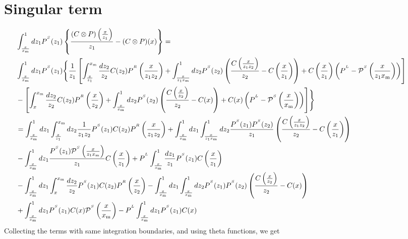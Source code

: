 \documentclass[a4paper]{article}
\newcommand{\PR}[0]{P^{^R}}
\newcommand{\PS}[0]{P^{^S}}
\newcommand{\PmS}[0]{\mathcal{P}^{^S}}
\newcommand{\PL}[0]{P^{^L}}
\newcommand{\xm}[0]{x_{\rm m}}
\newcommand{\zo}[0]{{z_1}}
\newcommand{\zt}[0]{{z_2}}
\begin{document}
\section{Singular term}

\begin{equation*}
	\hspace{-1.cm}\begin{split}
		&  \int_{\frac{x}{\xm}}^1dz_1 \PS(z_1) \left\{ \frac{(C \otimes P)\left(\frac{x}{z_1}\right)}{z_1} - (C \otimes P)(x)\right\} = \\
		& \int_{\frac{x}{\xm}}^1d\zo \PS(\zo) \Biggl\{\frac{1}{\zo}\left[\int_{\frac{x}{\zo}}^{\xm}\frac{d\zt}{\zt}C(\zt)\PR\left(\frac{x}{\zo \zt}\right) + \int_{\frac{x}{\zo \xm}}^1d\zt \PS(\zt)\left(\frac{C\left(\frac{x}{\zo \zt}\right)}{\zt}-C\left(\frac{x}{\zo}\right)\right) + C\left(\frac{x}{\zo}\right)\left(\PL - \PmS\left(\frac{x}{\zo \xm}\right)\right) \right] \\
		&- \left[\int_x^{\xm}\frac{d\zt}{\zt} C(\zt) \PR\left(\frac{x}{\zt}\right) + \int_\frac{x}{\xm}^1 d\zt \PS(\zt)\left(\frac{C\left(\frac{x}{\zt}\right)}{\zt}-C(x)\right) + C(x)\left(\PL - \PmS\left(\frac{x}{\xm}\right)\right) \right] \Biggr\} \\
		&=\int_{\frac{x}{\xm}}^1d\zo \int_\frac{x}{\zo}^{\xm}d\zt \frac{1}{\zo \zt} \PS(\zo) C(\zt) \PR\left(\frac{x}{\zo \zt}\right) + \int_{\frac{x}{\xm}}^1d\zo \int_\frac{x}{\zo \xm}^1d\zt \frac{\PS(\zo)\PS(\zt)}{\zo}\left(\frac{C\left(\frac{x}{\zo \zt}\right)}{\zt}-C\left(\frac{x}{\zo}\right)\right) \\
		&-\int_\frac{x}{\xm}^1d\zo \frac{ \PS(\zo)\PmS\left(\frac{x}{\zo \xm}\right) }{\zo} C\left(\frac{x}{\zo}\right) + \PL \int_\frac{x}{\xm}^1\frac{d\zo}{\zo}\PS(\zo)C\left(\frac{x}{\zo}\right) \\
		&- \int_\frac{x}{\xm}^1d\zo \int_x^{\xm}\frac{d\zt}{\zt} \PS(\zo) C(\zt) \PR\left(\frac{x}{\zt}\right)  - \int_\frac{x}{\xm}^1 d\zo \int_\frac{x}{\xm}^1 d\zt \PS(\zo) \PS(\zt) \left(\frac{C\left(\frac{x}{\zt}\right)}{\zt}-C(x)\right) \\
		&+ \int_\frac{x}{\xm}^1 d \zo\PS(\zo) C(x)  \PmS\left(\frac{x}{\xm}\right) - \PL \int_\frac{x}{\xm}^1 d\zo \PS(\zo) C(x)
\end{split}
\end{equation*}
Collecting the terms with same integration boundaries, and using theta functions, we get
\end{document}
